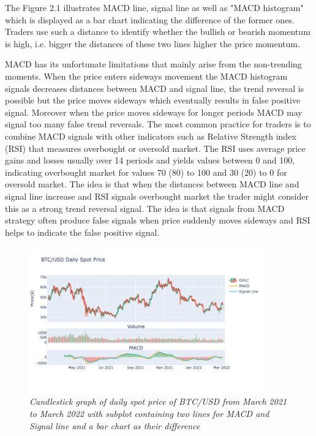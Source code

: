 The Figure 2.1 illustrates MACD line, signal line as well as "MACD histogram" which is displayed as a bar chart indicating the difference of the former ones. Traders use such a distance to identify whether the bullish or bearish momentum is high, i.e. bigger the distances of these two lines higher the price momentum.

MACD has its unfortunate limitations that mainly arise from the non-trending moments. When the price enters sideways movement the MACD histogram signals decreases distances between MACD and signal line, the trend reversal is possible but the price moves sideways which eventually results in false positive signal. Moreover when the price moves sideways for longer periods MACD may signal too many false trend reversals. The most common practice for traders is to combine MACD signals with other indicators such as Relative Strength index (RSI) that measures overbought or oversold market. The RSI uses average price gains and losses usually over 14 periods and yields values between 0 and 100, indicating overbought market for values 70 (80) to 100 and 30 (20) to 0 for oversold market. The idea is that when the distances between MACD line and signal line increase and RSI signals overbought market the trader might consider this as a strong trend reversal signal. The idea is that signals from MACD strategy often produce false signals when price suddenly moves sideways and RSI helps to indicate the false positive signal. 

\begin{figure}[h]

\begin{center}
	\includegraphics[width=0.9\textwidth]{MACD.png}
\end{center}

\caption{\textit{ Candlestick graph of daily spot price of BTC/USD from March 2021 to March 2022 with subplot containing two lines for MACD and Signal line and a bar chart as their difference}}

\end{figure}

